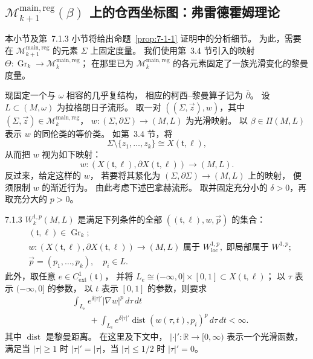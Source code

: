 
\subsection{$\mathcal M_{k+1}^{\mathrm{main,reg}}(\beta)$ 上的仓西坐标图：弗雷德霍姆理论}
\label{subsec:7-1-2}

本小节及第~7.1.3 小节将给出命题~\ref{prop:7-1-1}
证明中的分析细节。
为此，需要在
$\mathcal M^{\mathrm{main,reg}}_{k+1}$
的元素 $\Sigma$ 上固定度量。
我们使用第~3.4 节引入的映射
$\Theta\colon\operatorname{Gr}_k\to
\mathcal M^{\mathrm{main,reg}}_k$；
在那里已为
$\mathcal M^{\mathrm{main,reg}}_k$
的各元素固定了一族光滑变化的黎曼度量。

现固定一个与 $\omega$ 相容的几乎复结构，
相应的柯西--黎曼算子记为 $\bar\partial$。
设 $L\subset(M,\omega)$ 为拉格朗日子流形。
取一对 $((\Sigma,\vec z),w)$，其中
$(\Sigma,\vec z)\in\mathcal M^{\mathrm{main,reg}}_k$，
$w\colon(\Sigma,\partial\Sigma)\to(M,L)$ 为光滑映射。
以 $\beta\in\Pi(M,L)$ 表示 $w$ 的同伦类的等价类。
如第~3.4 节，将
\[
\Sigma\setminus\{z_1,\ldots,z_k\}\cong X(\mathfrak t,\ell),
\]
从而把 $w$ 视为如下映射：
\[
w\colon(X(\mathfrak t,\ell),\partial X(\mathfrak t,\ell))
\longrightarrow(M,L).
\]
反过来，给定这样的 $w$，
若要将其紧化为
$(\Sigma,\partial\Sigma)\to(M,L)$ 上的映射，
便须限制 $w$ 的渐近行为。
由此考虑下述巴拿赫流形。
取并固定充分小的 $\delta>0$，再取充分大的 $p>0$。

\begin{definition}{7.1.3}\label{def:7-1-3}
$W_k^{1,p}(M,L)$ 是满足下列条件的全部
$((\mathfrak t,\ell),w,\vec p)$ 的集合：
\begin{align*}
& (\mathfrak t,\ell)\in\operatorname{Gr}_k;
  \tag{7.1.4.1}\label{eq:7-1-4-1}\\
& w\colon(X(\mathfrak t,\ell),\partial X(\mathfrak t,\ell))
   \to(M,L)\text{ 属于 }W^{1,p}_{\mathrm{loc}},
   \text{ 即局部属于 }W^{1,p};
  \tag{7.1.4.2}\label{eq:7-1-4-2}\\
& \vec p=(p_1,\ldots,p_k),\quad p_i\in L.
  \tag{7.1.4.3}\label{eq:7-1-4-3}
\end{align*}
此外，取任意 $e\in C^1_{\mathrm{ext}}(\mathfrak t)$，
并将
$L_e\cong(-\infty,0]\times[0,1]
\subset X(\mathfrak t,\ell)$；
以 $\tau$ 表示 $(-\infty,0]$ 的参数，
以 $t$ 表示 $[0,1]$ 的参数，则要求
\begin{equation}
\begin{aligned}
&\int_{L_e}e^{\delta|\tau|'}|\nabla w|^p\,d\tau\,dt\\
&\qquad+\int_{L_e}e^{\delta|\tau|'}
\operatorname{dist}(w(\tau,t),p_i)^p\,d\tau\,dt<\infty.
\end{aligned}
\tag{7.1.4.4}\label{eq:7-1-4-4}
\end{equation}
其中 $\operatorname{dist}$ 是黎曼距离。
在这里及下文中，
$|\cdot|'\colon\mathbb R\to[0,\infty)$
表示一个光滑函数，满足当 $|\tau|\ge1$ 时
$|\tau|'=|\tau|$，当 $|\tau|\le1/2$ 时
$|\tau|'=0$。
\end{definition}

